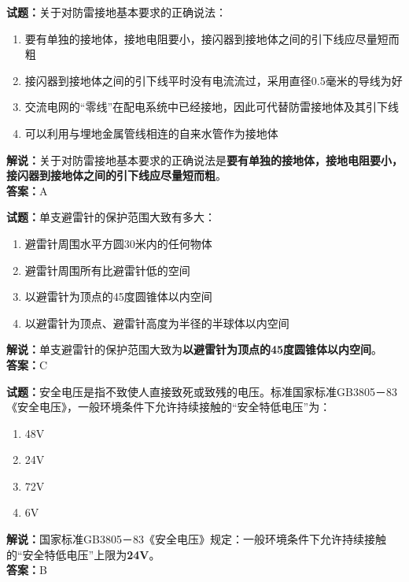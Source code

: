 \documentclass{ctexbook}
\begin{document}
\vspace{1em}

\textbf{试题：}关于对防雷接地基本要求的正确说法：
\begin{enumerate}[leftmargin=3em]
  \item 要有单独的接地体，接地电阻要小，接闪器到接地体之间的引下线应尽量短而粗
  \item 接闪器到接地体之间的引下线平时没有电流流过，采用直径0.5毫米的导线为好
  \item 交流电网的“零线”在配电系统中已经接地，因此可代替防雷接地体及其引下线
  \item 可以利用与埋地金属管线相连的自来水管作为接地体
\end{enumerate}
\noindent\textbf{解说：}关于对防雷接地基本要求的正确说法是\textbf{要有单独的接地体，接地电阻要小，接闪器到接地体之间的引下线应尽量短而粗}。\\\noindent\textbf{答案：}A

\vspace{1em}

\textbf{试题：}单支避雷针的保护范围大致有多大：
\begin{enumerate}[leftmargin=3em]
  \item 避雷针周围水平方圆30米内的任何物体
  \item 避雷针周围所有比避雷针低的空间
  \item 以避雷针为顶点的45度圆锥体以内空间
  \item 以避雷针为顶点、避雷针高度为半径的半球体以内空间
\end{enumerate}
\noindent\textbf{解说：}单支避雷针的保护范围大致为\textbf{以避雷针为顶点的45度圆锥体以内空间}。\\\noindent\textbf{答案：}C

\vspace{1em}

\textbf{试题：}安全电压是指不致使人直接致死或致残的电压。标准国家标准GB3805－83《安全电压》，一般环境条件下允许持续接触的“安全特低电压”为：
\begin{enumerate}[leftmargin=3em]
  \item 48V
  \item 24V
  \item 72V
  \item 6V
\end{enumerate}
\noindent\textbf{解说：}国家标准GB3805－83《安全电压》规定：一般环境条件下允许持续接触的“安全特低电压”上限为\textbf{24V}。\\\noindent\textbf{答案：}B

\vspace{1em}
\end{document}
